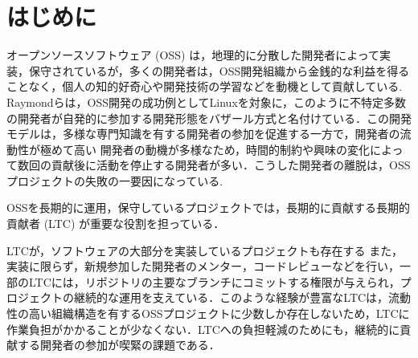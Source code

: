 \documentclass[submit,techrep,noauthor]{ipsj}
\begin{document}
\maketitle

\section{はじめに}
オープンソースソフトウェア (OSS) は，地理的に分散した開発者によって実装，保守されているが，多くの開発者は，OSS開発組織から金銭的な利益を得ることなく，個人の知的好奇心や開発技術の学習などを動機として貢献している\cite{motivation}.
Raymondらは，OSS開発の成功例としてLinuxを対象に，このように不特定多数の開発者が自発的に参加する開発形態をバザール方式と名付けている\cite{bazaar}．この開発モデルは，多様な専門知識を有する開発者の参加を促進する一方で，開発者の流動性が極めて高い\cite{movement}
開発者の動機が多様なため，時間的制約や興味の変化によって数回の貢献後に活動を停止する開発者が多い\cite{OTC}．こうした開発者の離脱は，OSSプロジェクトの失敗の一要因になっている\cite{failed}.



OSSを長期的に運用，保守しているプロジェクトでは，長期的に貢献する長期的貢献者 (LTC) が重要な役割を担っている\cite{related1}\cite{successful}．

LTCが，ソフトウェアの大部分を実装しているプロジェクトも存在する\cite{LTC}
また，実装に限らず，新規参加した開発者のメンター，コードレビューなどを行い，一部のLTCには，リポジトリの主要なブランチにコミットする権限が与えられ，プロジェクトの継続的な運用を支えている\cite{LTC}．このような経験が豊富なLTCは，流動性の高い組織構造を有するOSSプロジェクトに少数しか存在しないため，LTCに作業負担がかかることが少なくない\cite{related2}．LTCへの負担軽減のためにも，継続的に貢献する開発者の参加が喫緊の課題である．


\end{document}
